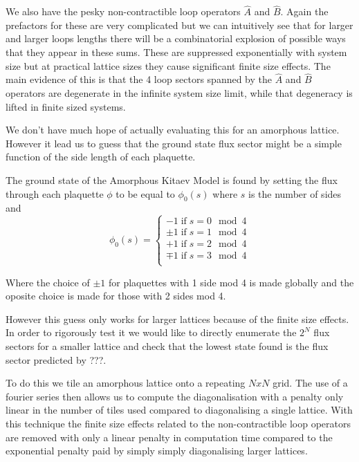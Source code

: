 We also have the pesky non-contractible loop operators \(\hat{A}\) and
\(\hat{B}\). Again the prefactors for these are very complicated but we
can intuitively see that for larger and larger loops lengths there will
be a combinatorial explosion of possible ways that they appear in these
sums. These are suppressed exponentially with system size but at
practical lattice sizes they cause significant finite size effects. The
main evidence of this is that the 4 loop sectors spanned by the
\(\hat{A}\) and \(\hat{B}\) operators are degenerate in the infinite
system size limit, while that degeneracy is lifted in finite sized
systems.

We don't have much hope of actually evaluating this for an amorphous
lattice. However it lead us to guess that the ground state flux sector
might be a simple function of the side length of each plaquette.

The ground state of the Amorphous Kitaev Model is found by setting the
flux through each plaquette \(\phi\) to be equal to \(\phi_0(s)\) where
\(s\) is the number of sides and \[   
\phi_0(s) = 
     \begin{cases}
       -1 \;\textrm{if}\; s = 0 \mod 4\\
       \pm 1 \;\textrm{if}\; s = 1 \mod 4\\
       +1 \;\textrm{if}\; s = 2 \mod 4\\
       \mp 1 \;\textrm{if}\; s = 3 \mod 4\\
     \end{cases}
\]

Where the choice of \(\pm 1\) for plaquettes with 1 side mod 4 is made
globally and the oposite choice is made for those with 2 sides mod 4.

However this guess only works for larger lattices because of the finite
size effects. In order to rigorously test it we would like to directly
enumerate the \(2^N\) flux sectors for a smaller lattice and check that
the lowest state found is the flux sector predicted by ???.

To do this we tile an amorphous lattice onto a repeating \(NxN\) grid.
The use of a fourier series then allows us to compute the
diagonalisation with a penalty only linear in the number of tiles used
compared to diagonalising a single lattice. With this technique the
finite size effects related to the non-contractible loop operators are
removed with only a linear penalty in computation time compared to the
exponential penalty paid by simply simply diagonalising larger lattices.

